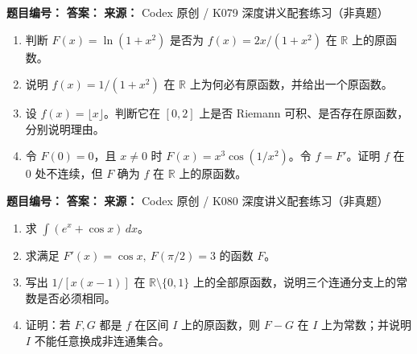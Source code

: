 
\begin{problemBox}
\begin{problemMeta}
\textbf{题目编号：}  \quad
\textbf{答案：}  \quad
\textbf{来源：} Codex 原创 / K079 深度讲义配套练习（非真题）
\end{problemMeta}
\begin{enumerate}
  \item[\textbf{A}] 判断 \(F(x)=\ln(1+x^2)\) 是否为 \(f(x)=2x/(1+x^2)\) 在 \(\mathbb R\) 上的原函数。
  \item[\textbf{B}] 说明 \(f(x)=1/(1+x^2)\) 在 \(\mathbb R\) 上为何必有原函数，并给出一个原函数。
  \item[\textbf{C}] 设 \(f(x)=\lfloor x\rfloor\)。判断它在 \([0,2]\) 上是否 Riemann 可积、是否存在原函数，分别说明理由。
  \item[\textbf{M}] 令 \(F(0)=0\)，且 \(x\ne0\) 时 \(F(x)=x^3\cos(1/x^2)\)。令 \(f=F'\)。证明 \(f\) 在 \(0\) 处不连续，但 \(F\) 确为 \(f\) 在 \(\mathbb R\) 上的原函数。
\end{enumerate}
\end{problemBox}

\begin{problemBox}
\begin{problemMeta}
\textbf{题目编号：}  \quad
\textbf{答案：}  \quad
\textbf{来源：} Codex 原创 / K080 深度讲义配套练习（非真题）
\end{problemMeta}
\begin{enumerate}
  \item[\textbf{A}] 求 \(\int(e^x+\cos x)\,dx\)。
  \item[\textbf{B}] 求满足 \(F'(x)=\cos x,\ F(\pi/2)=3\) 的函数 \(F\)。
  \item[\textbf{C}] 写出 \(1/[x(x-1)]\) 在 \(\mathbb R\setminus\{0,1\}\) 上的全部原函数，说明三个连通分支上的常数是否必须相同。
  \item[\textbf{M}] 证明：若 \(F,G\) 都是 \(f\) 在区间 \(I\) 上的原函数，则 \(F-G\) 在 \(I\) 上为常数；并说明 \(I\) 不能任意换成非连通集合。
\end{enumerate}
\end{problemBox}

